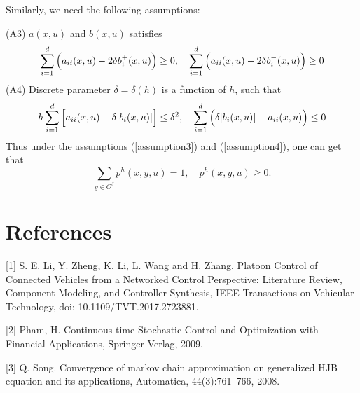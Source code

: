 \documentclass{article}
\begin{document}
Similarly, we need the following assumptions:

(A3) $a(x, u)$ and $b(x, u)$ satisfies
\begin{equation} \label{assumption3}
    \sum_{i = 1}^{d} \Big{(} a_{ii}(x, u) - 2 \delta b_{i}^{+} (x, u) \Big{)} \geq 0, \quad \sum_{i = 1}^{d} \Big{(} a_{ii}(x, u) - 2 \delta b_{i}^{-} (x, u) \Big{)} \geq 0
\end{equation}
(A4) Discrete parameter $\delta = \delta(h)$ is a function of $h$, such that
\begin{equation} \label{assumption4}
    h \sum_{i = 1}^{d} \Big{[} a_{ii} (x, u) - \delta |b_{i}(x, u)| \Big{]} \leq \delta^{2}, \quad \sum_{i = 1}^{d} \Big{(} \delta |b_{i}(x, u) | - a_{ii} (x, u) \Big{)} \leq 0
\end{equation}
Thus under the assumptions (\ref{assumption3}) and (\ref{assumption4}), one can get that
\begin{equation*}
    \sum_{y \in O^{\delta}} p^{h} (x, y, u) = 1, \quad p^{h}(x, y, u) \geq 0.
\end{equation*}













\section*{References}

%
\begin{description}
\item{}
[1] S. E. Li, Y. Zheng, K. Li, L. Wang and H. Zhang. Platoon Control of Connected Vehicles from a Networked Control Perspective: Literature Review, Component Modeling, and Controller Synthesis, IEEE Transactions on Vehicular Technology, doi: 10.1109/TVT.2017.2723881.
\item{}
[2] Pham, H. Continuous-time Stochastic Control and Optimization with Financial Applications, Springer-Verlag, 2009.
\item{}
[3] Q. Song. Convergence of markov chain approximation on generalized HJB equation and its applications, Automatica, 44(3):761–766, 2008.
\item{}


\end{description}


%
%
% 
% 
\end{document}
